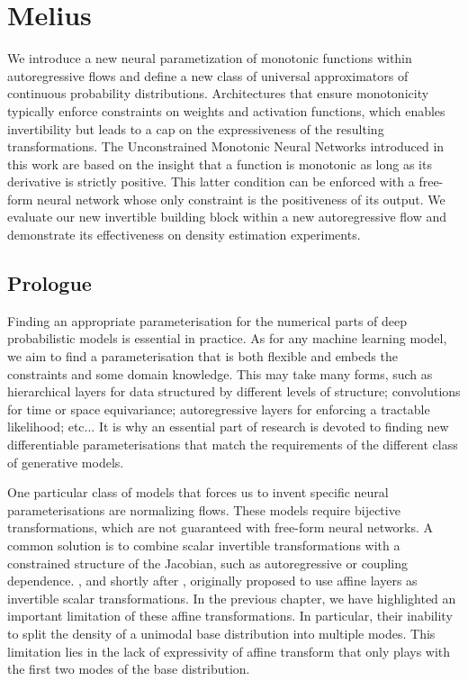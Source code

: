 \chapter{Melius}\label{ch:05}

\begin{chapter_outline}

We introduce a new neural parametization of monotonic functions within autoregressive flows and define a new class of universal approximators of continuous probability distributions.
Architectures that ensure monotonicity typically enforce constraints on weights and activation functions, which enables invertibility but leads to a cap on the expressiveness of the resulting transformations.
The Unconstrained Monotonic Neural Networks introduced in this work are based on the insight that a function is monotonic as long as its derivative is strictly positive. This latter condition can be enforced with a free-form neural network whose only constraint is the positiveness of its output.
We evaluate our new invertible building block within a new autoregressive flow and demonstrate its effectiveness on density estimation experiments.
\end{chapter_outline}

\section{Prologue}
Finding an appropriate parameterisation for the numerical parts of deep probabilistic models is essential in practice. As for any machine learning model, we aim to find a parameterisation that is both flexible and embeds the constraints and some domain knowledge. This may take many forms, such as hierarchical layers for data structured by different levels of structure; convolutions for time or space equivariance; autoregressive layers for enforcing a tractable likelihood; etc... It is why an essential part of research is devoted to finding new differentiable parameterisations that match the requirements of the different class of generative models.

One particular class of models that forces us to invent specific neural parameterisations are normalizing flows. These models require bijective transformations, which are not guaranteed with free-form neural networks. A common solution is to combine scalar invertible transformations with a constrained structure of the Jacobian, such as autoregressive or coupling dependence. \citet{rezende2015variational}, and shortly after \citet{kingma_improved_2016, dinh_density_2017}, originally proposed to use affine layers as invertible scalar transformations. In the previous chapter, we have highlighted an important limitation of these affine transformations. In particular, their inability to split the density of a unimodal base distribution into multiple modes. This limitation lies in the lack of expressivity of affine transform that only plays with the first two modes of the base distribution.

